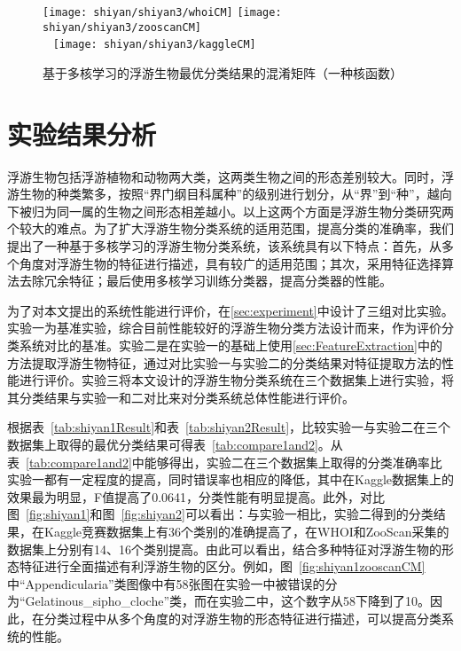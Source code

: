 \begin{figure}[h]
  \centering%
    {\texttt{[image: shiyan/shiyan3/whoiCM]}}%
      {\texttt{[image: shiyan/shiyan3/zooscanCM]}}\\
  ~\newline
      {\texttt{[image: shiyan/shiyan3/kaggleCM]}}
  \caption{基于多核学习的浮游生物最优分类结果的混淆矩阵（一种核函数）}
  \label{fig:shiyan3}
\end{figure}

\section{实验结果分析}

浮游生物包括浮游植物和动物两大类，这两类生物之间的形态差别较大。同时，浮游生物的种类繁多，按照“界门纲目科属种”的级别进行划分，从“界”到“种”，越向下被归为同一属的生物之间形态相差越小。以上这两个方面是浮游生物分类研究两个较大的难点。为了扩大浮游生物分类系统的适用范围，提高分类的准确率，我们提出了一种基于多核学习的浮游生物分类系统，该系统具有以下特点：首先，从多个角度对浮游生物的特征进行描述，具有较广的适用范围；其次，采用特征选择算法去除冗余特征；最后使用多核学习训练分类器，提高分类器的性能。

为了对本文提出的系统性能进行评价，在\ref{sec:experiment}中设计了三组对比实验。实验一为基准实验，综合目前性能较好的浮游生物分类方法设计而来，作为评价分类系统对比的基准。实验二是在实验一的基础上使用\ref{sec:FeatureExtraction}中的方法提取浮游生物特征，通过对比实验一与实验二的分类结果对特征提取方法的性能进行评价。实验三将本文设计的浮游生物分类系统在三个数据集上进行实验，将其分类结果与实验一和二对比来对分类系统总体性能进行评价。

根据表~\ref{tab:shiyan1Result}和表~\ref{tab:shiyan2Result}，比较实验一与实验二在三个数据集上取得的最优分类结果可得表~\ref{tab:compare1and2}。从表~\ref{tab:compare1and2}中能够得出，实验二在三个数据集上取得的分类准确率比实验一都有一定程度的提高，同时错误率也相应的降低，其中在Kaggle数据集上的效果最为明显，F值提高了0.0641，分类性能有明显提高。此外，对比图~\ref{fig:shiyan1}和图~\ref{fig:shiyan2}可以看出：与实验一相比，实验二得到的分类结果，在Kaggle竞赛数据集上有36个类别的准确提高了，在WHOI和ZooScan采集的数据集上分别有14、16个类别提高。由此可以看出，结合多种特征对浮游生物的形态特征进行全面描述有利浮游生物的区分。例如，图~\ref{fig:shiyan1zooscanCM}中“Appendicularia”类图像中有58张图在实验一中被错误的分为“Gelatinous\_sipho\_cloche”类，而在实验二中，这个数字从58下降到了10。因此，在分类过程中从多个角度的对浮游生物的形态特征进行描述，可以提高分类系统的性能。

